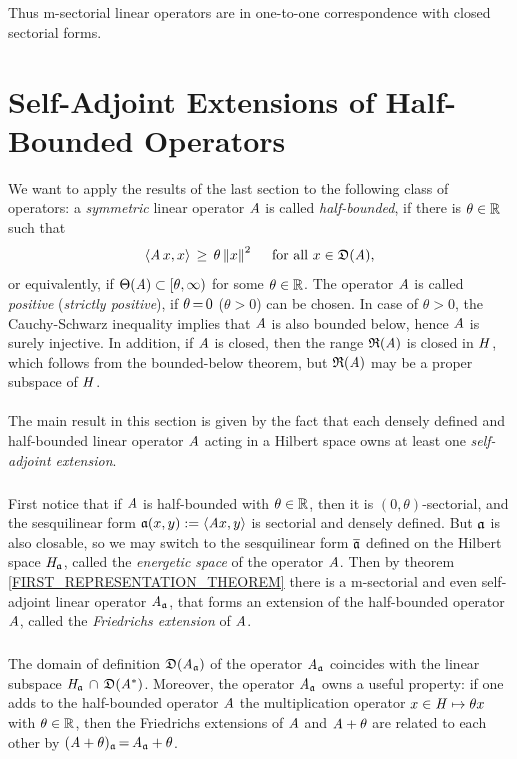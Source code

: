 \documentclass[11pt,twoside]{article}
\begin{document}
\subparagraph*{}
Thus m-sectorial linear operators are in one-to-one correspondence
with closed sectorial forms.

\section{Self-Adjoint Extensions of Half-Bounded Operators}                    %
We want to apply the results of the last section
to the following class of operators:
a \textit{symmetric} linear operator $\mathit{A}$ is called \textit{half-bounded},
if there is $\theta \in {\mathbb{R}}$ such that
\[
\langle \mathit{A} \,x,x \rangle \, \geq \, \theta \left\lVert x \right\rVert^2
\quad \mbox{ for all } x \in \mathfrak{D}(\mathit{A}),
\]
or equivalently,
if $\Theta(\mathit{A}) \subset [\theta,\infty)$ for some $\theta \in {\mathbb{R}}$.
The operator $\mathit{A}$ is called \textit{positive} (\textit{strictly positive}),
if $\theta {\,=\,} 0$ ($\theta > 0$) can be chosen.
In case of $\theta > 0$,
the {Cauchy-Schwarz} inequality implies
that $\mathit{A}$ is also bounded below,
hence $\mathit{A}$ is surely injective.
In addition,
if $\mathit{A}$ is closed,
then the range $\mathfrak{R}(\mathit{A})$ is closed in $\mathit{H}$,
which follows from the bounded-below theorem,
but $\mathfrak{R}(\mathit{A})$ may be a proper subspace of $\mathit{H}$.

\paragraph*{}
The main result in this section is given by the fact
that each densely defined and half-bounded linear operator $\mathit{A}$
acting in a Hilbert space owns at least one \textit{self-adjoint extension}.

\subparagraph*{}
First notice that if $\mathit{A}$ is half-bounded with $\theta \in {\mathbb{R}}$,
then it is $(0,\theta)$-sectorial,
and the sesquilinear form $\mathfrak{a}(x,y) := \langle \mathit{A} x,y \rangle$
is sectorial and densely defined.
But $\mathfrak{a}$ is also closable,
so we may switch to the sesquilinear form $\overline{\mathfrak{a}}$ defined on the
Hilbert space $\mathit{H}_{\mathfrak{a}}$,
called the \textit{energetic space} of the operator $\mathit{A}$.
Then by theorem \ref{FIRST_REPRESENTATION_THEOREM}
there is a m-sectorial and even self-adjoint linear operator $\mathit{A}_{\mathfrak{a}}$,
that forms an extension of the half-bounded operator $\mathit{A}$,
called the \textit{Friedrichs extension} of $\mathit{A}$.

\subparagraph*{}
The domain of definition $\mathfrak{D}(\mathit{A}_{\mathfrak{a}})$ of the operator $\mathit{A}_{\mathfrak{a}}$
coincides with the linear subspace $\mathit{H}_{\mathfrak{a}} \, \cap \, \mathfrak{D}(\mathit{A}^*)$.
Moreover,
the operator $\mathit{A}_{\mathfrak{a}}$ owns a useful property:
if one adds to the half-bounded operator $\mathit{A}$ the multiplication operator 
$x \in \mathit{H} \mapsto \theta x$ with $\theta \in {\mathbb{R}}$,
then the {Friedrichs} extensions of $\mathit{A}$ and $\mathit{A} + \theta$
are related to each other by
$(\mathit{A} + \theta)_{\mathfrak{a}} {\,=\,} \mathit{A}_{\mathfrak{a}} + \theta$.
\end{document}
